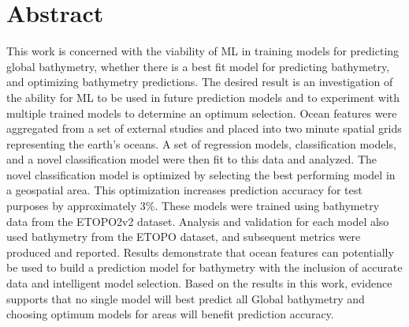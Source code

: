 \section{Abstract}
\setlength{\parindent}{10ex}
This work is concerned with the viability of \ac{ML} in training models for predicting global bathymetry, whether there is a best fit model for predicting bathymetry, and optimizing bathymetry predictions. 
The desired result is an investigation of the ability for ML to be used in future prediction models and to experiment with multiple trained models 
to determine an optimum selection. Ocean features were aggregated from a set of external studies and placed into two minute spatial grids representing 
the earth's oceans. A set of regression models, classification models, and a novel classification model were then fit to this data and analyzed. 
The novel classification model is optimized by selecting the best performing model in a geospatial area. This optimization increases prediction accuracy
for test purposes by approximately 3\%. 
These models were trained using bathymetry data from the ETOPO2v2 dataset. Analysis and validation for each model also used bathymetry from the 
ETOPO dataset, and subsequent metrics were produced and reported. Results demonstrate that ocean features can potentially be used to build a 
prediction model for bathymetry with the inclusion of accurate data and intelligent model selection. Based on the results in this work, evidence 
supports that no single model will best predict all Global bathymetry and choosing optimum models for areas will benefit prediction accuracy.